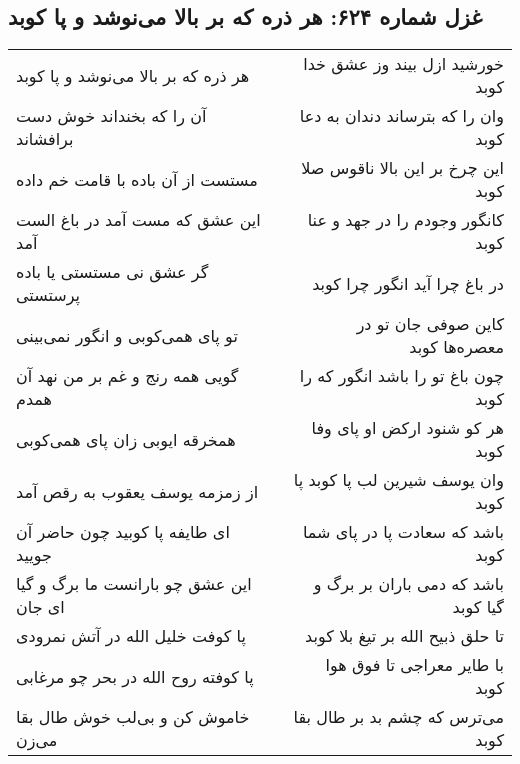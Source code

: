 \begin{center}
\section*{غزل شماره ۶۲۴: هر ذره که بر بالا می‌نوشد و پا کوبد}
\label{sec:0624}
\begin{longtable}{l p{0.5cm} r}
هر ذره که بر بالا می‌نوشد و پا کوبد
&&
خورشید ازل بیند وز عشق خدا کوبد
\\
آن را که بخنداند خوش دست برافشاند
&&
وان را که بترساند دندان به دعا کوبد
\\
مستست از آن باده با قامت خم داده
&&
این چرخ بر این بالا ناقوس صلا کوبد
\\
این عشق که مست آمد در باغ الست آمد
&&
کانگور وجودم را در جهد و عنا کوبد
\\
گر عشق نی مستستی یا باده پرستستی
&&
در باغ چرا آید انگور چرا کوبد
\\
تو پای همی‌کوبی و انگور نمی‌بینی
&&
کاین صوفی جان تو در معصره‌ها کوبد
\\
گویی همه رنج و غم بر من نهد آن همدم
&&
چون باغ تو را باشد انگور که را کوبد
\\
همخرقه ایوبی زان پای همی‌کوبی
&&
هر کو شنود ارکض او پای وفا کوبد
\\
از زمزمه یوسف یعقوب به رقص آمد
&&
وان یوسف شیرین لب پا کوبد پا کوبد
\\
ای طایفه پا کوبید چون حاضر آن جویید
&&
باشد که سعادت پا در پای شما کوبد
\\
این عشق چو بارانست ما برگ و گیا ای جان
&&
باشد که دمی باران بر برگ و گیا کوبد
\\
پا کوفت خلیل الله در آتش نمرودی
&&
تا حلق ذبیح الله بر تیغ بلا کوبد
\\
پا کوفته روح الله در بحر چو مرغابی
&&
با طایر معراجی تا فوق هوا کوبد
\\
خاموش کن و بی‌لب خوش طال بقا می‌زن
&&
می‌ترس که چشم بد بر طال بقا کوبد
\\
\end{longtable}
\end{center}

